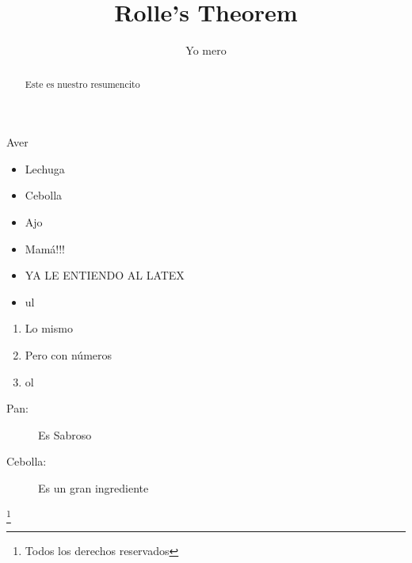 \documentclass{article}
\title{Rolle's Theorem}
\author{Yo mero}
\date{}
\begin{document}
    \maketitle

    \begin{abstract}
        Este es nuestro resumencito
    \end{abstract}
    Aver

    \begin{itemize}
        \item Lechuga
        \item Cebolla
        \item Ajo
        \item Mamá!!!
        \item YA LE ENTIENDO AL LATEX
        \item ul
    \end{itemize}

    \begin{enumerate}
        \item Lo mismo
        \item Pero con números
        \item ol
    \end{enumerate}

    \begin{description}
        \item[Pan:] Es Sabroso
        \item[Cebolla:] Es un gran ingrediente 
    \end{description}

    \footnote{Todos los derechos reservados}
\end{document}
